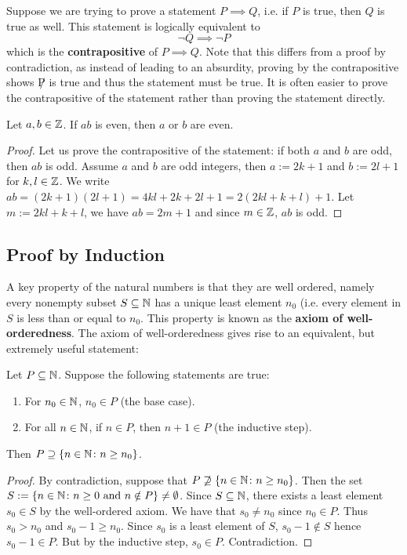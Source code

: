 Suppose we are trying to prove a statement $P \implies Q$, i.e. if $P$ is true, then $Q$ is true as well. This statement is logically equivalent to
\[ \neg Q \implies \neg P \]
which is the \textbf{contrapositive} of $P \implies Q$. Note that this differs from a proof by contradiction, as instead of leading to an absurdity, proving by the contrapositive shows $\not P$ is true and thus the statement must be true. It is often easier to prove the contrapositive of the statement rather than proving the statement directly.

\begin{lemmabox}
   Let $a, b \in \mathbb{Z}$. If $ab$ is even, then $a$ or $b$ are even.
\end{lemmabox}
\begin{proof}
   Let us prove the contrapositive of the statement: if both $a$ and $b$ are odd, then $ab$ is odd. Assume $a$ and $b$ are odd integers, then $a := 2k + 1$ and $b := 2l + 1$ for $k, l \in \mathbb{Z}$. We write $ab = (2k + 1)(2l + 1) = 4kl + 2k + 2l + 1= 2(2kl + k + l) + 1$. Let $m := 2kl + k + l$, we have $ab = 2m + 1$ and since $m \in \mathbb{Z}$, $ab$ is odd. 
\end{proof}

\subsection{Proof by Induction}

A key property of the natural numbers is that they are well ordered, namely every nonempty subset $S \subseteq \mathbb{N}$ has a unique least element $n_0$ (i.e. every element in $S$ is less than or equal to $n_0$. This property is known as the \textbf{axiom of well-orderedness}. The axiom of well-orderedness gives rise to an equivalent, but extremely useful statement:

\begin{thmbox}
   Let $P \subseteq \mathbb{N}$. Suppose the following statements are true:
   \begin{enumerate}
      \item For $n_0 \in \mathbb{N}$, $n_0 \in P$ (the base case).
      \item For all $n \in \mathbb{N}$, if $n \in P$, then $n + 1 \in P$ (the inductive step).
   \end{enumerate}
   Then $P \supseteq \{n \in \mathbb{N} \colon n \geq n_0\}$.
\end{thmbox}

\begin{proof}
   By contradiction, suppose that $P \not\supseteq \{n \in \mathbb{N} \colon n \geq n_0\}$. Then the set $S := \{n \in \mathbb{N} \colon n \geq 0 \text{ and } n \notin P\} \neq \emptyset$. Since $S \subseteq \mathbb{N}$, there exists a least element $s_0 \in S$ by the well-ordered axiom. We have that $s_0 \neq n_0$ since $n_0 \in P$. Thus $s_0 > n_0$ and $s_0 - 1 \geq n_0$. Since $s_0$ is a least element of $S$, $s_0 - 1 \notin S$ hence $s_0 - 1 \in P$. But by the inductive step, $s_0 \in P$. Contradiction.
\end{proof}
   


